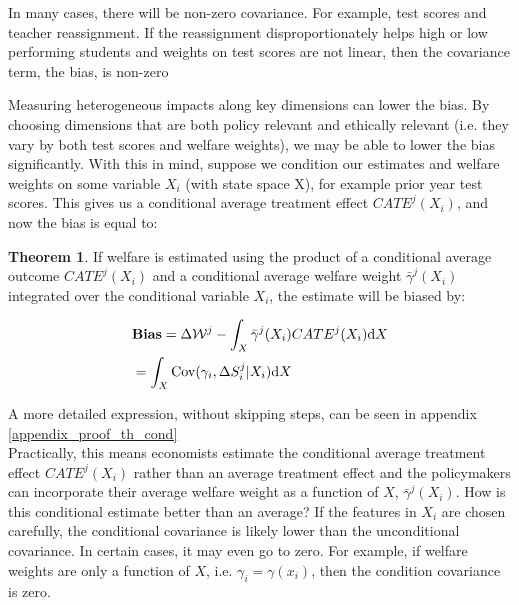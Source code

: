 \documentclass[12pt]{article}
\theoremstyle{definition}
\theoremstyle{definition}
\theoremstyle{definition}
\theoremstyle{definition}
\newtheorem{thm}{Theorem}
\begin{document}
   In many cases, there will be non-zero covariance. For example, test scores and teacher reassignment. If the reassignment disproportionately helps high or low performing students and weights on test scores are not linear, then the covariance term, the bias, is non-zero

 Measuring heterogeneous impacts along key dimensions can lower the bias. By choosing dimensions that are both policy relevant and ethically relevant (i.e. they vary by both test scores and welfare weights), we may be able to lower the bias significantly. With this in mind, suppose we condition our estimates and welfare weights on some variable $X_i$ (with state space X), for example prior year test scores. This gives us a conditional average treatment effect $CATE^j(X_i)$, and now the bias is equal to:



    \begin{thm}
    \label{thm_cond_bias}
       If welfare is estimated using the product of a conditional average outcome $CATE^j(X_i)$ and a conditional average welfare weight $\bar{\gamma}^j(X_i)$ integrated over the conditional variable $X_i$,  the estimate will be biased by: 
        
        \begin{align*}
       & \textbf{Bias} = \Delta \mathcal{W}^j - \int_X \bar{\gamma}^j(X_i) CATE^j(X_i)\text{d}X  \\
       & = \int_X \mathrm{Cov}(\gamma_i, \Delta S^j_i| X_i)\text{d}X
    \end{align*}
    \end{thm}

    A more detailed expression, without skipping steps, can be seen in appendix \ref{appendix_proof_th_cond}
    \\
    
    Practically, this means economists estimate the conditional average treatment effect $ CATE^j(X_i)$ rather than an average treatment effect and the policymakers can incorporate their average welfare weight as a function of $X$,  $\bar{\gamma}^j(X_i)$.  How is this conditional estimate better than an average? If the features in $X_i$ are chosen carefully, the conditional covariance is likely lower than the unconditional covariance. In certain cases, it may even go to zero. For example, if welfare weights are only a function of $X$, i.e. $\gamma_i = \gamma(x_i)$, then the condition covariance is zero. 
    
\end{document}
